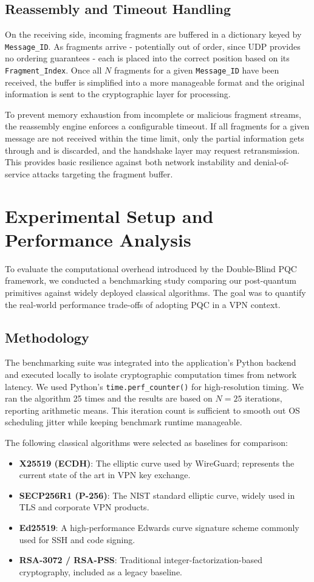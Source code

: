 \documentclass[10pt, conference, letterpaper]{IEEEtran}
\begin{document}
\subsection{Reassembly and Timeout Handling}
On the receiving side, incoming fragments are buffered in a dictionary keyed by \texttt{Message\_ID}. As fragments arrive - potentially out of order, since UDP provides no ordering guarantees - each is placed into the correct position based on its \texttt{Fragment\_Index}. Once all $N$ fragments for a given \texttt{Message\_ID} have been received, the buffer is simplified into a more manageable format and the original information is sent to the cryptographic layer for processing.

To prevent memory exhaustion from incomplete or malicious fragment streams, the reassembly engine enforces a configurable timeout. If all fragments for a given message are not received within the time limit, only the partial information gets through and is discarded, and the handshake layer may request retransmission. This provides basic resilience against both network instability and denial-of-service attacks targeting the fragment buffer.


\section{Experimental Setup and Performance Analysis}
To evaluate the computational overhead introduced by the Double-Blind PQC framework, we conducted a benchmarking study comparing our post-quantum primitives against widely deployed classical algorithms. The goal was to quantify the real-world performance trade-offs of adopting PQC in a VPN context.

\subsection{Methodology}
The benchmarking suite was integrated into the application's Python backend and executed locally to isolate cryptographic computation times from network latency. We used Python's \texttt{time.perf\_counter()} for high-resolution timing. We ran the algorithm 25 times and the results are based on $N = 25$ iterations, reporting arithmetic means. This iteration count is sufficient to smooth out OS scheduling jitter while keeping benchmark runtime manageable.

The following classical algorithms were selected as baselines for comparison:
\begin{itemize}
    \item \textbf{X25519 (ECDH)}: The elliptic curve used by WireGuard; represents the current state of the art in VPN key exchange.
    \item \textbf{SECP256R1 (P-256)}: The NIST standard elliptic curve, widely used in TLS and corporate VPN products.
    \item \textbf{Ed25519}: A high-performance Edwards curve signature scheme commonly used for SSH and code signing.
    \item \textbf{RSA-3072 / RSA-PSS}: Traditional integer-factorization-based cryptography, included as a legacy baseline.
\end{itemize}
\end{document}

